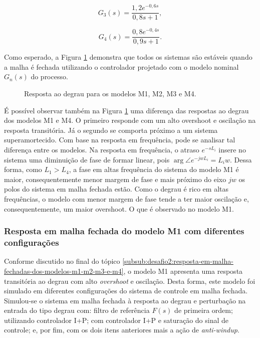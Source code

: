\begin{equation}
    \label{eq:desafio2:modelo-g3}
    G_{3}(s) = \frac{1,2e^{-0,6s}}{0,8s + 1},
\end{equation}

\begin{equation}
    \label{eq:desafio2:modelo-g4}
    G_{4}(s) = \frac{0,8e^{-0,4s}}{0,9s + 1}.
\end{equation}

Como esperado, a Figura \ref{fig:desafio2:questao5} demonstra que todos os
sistemas são estáveis quando a malha é fechada utilizando o controlador
projetado com o modelo nominal $G_{n}(s)$ do processo.

\begin{figure}[!ht]
    \caption{Resposta ao degrau para os modelos M1, M2, M3 e M4.}
    \vspace{-10pt}
    \hspace{-30pt}
    \label{fig:desafio2:questao5}
    \begin{minipage}{\linewidth}
        
    \end{minipage}
\end{figure}

É possível observar também na Figura \ref{fig:desafio2:questao5} uma diferença
das respostas ao degrau dos modelos M1 e M4. O primeiro responde com um alto
overshoot e oscilação na resposta transitória. Já o segundo se comporta próximo
a um sistema superamortecido. Com base na resposta em frequência, pode se
analisar tal diferença entre os modelos. Na resposta em frequência, o atraso
$e^{-sL_{i}}$ insere no sistema uma diminuição de fase de formar linear, pois
$\arg\angle e^{-jwL_{i}} = L_{i}w$. Dessa forma, como $L_{1} > L_{4}$, a fase em
altas frequência do sistema do modelo M1 é maior, consequentemente menor margem
de fase e mais próximo do eixo $jw$ os polos do sistema em malha fechada estão.
Como o degrau é rico em altas frequências, o modelo com menor margem de fase
tende a ter maior oscilação e, consequentemente, um maior overshoot. O que é
observado no modelo M1.

\subsubsection{Resposta em malha fechada do modelo M1 com diferentes configurações}
Conforme discutido no final do tópico
\ref{subsub:desafio2:resposta-em-malha-fechadas-dos-modelos-m1-m2-m3-e-m4}, o
modelo M1 apresenta uma resposta transitória ao degrau com alto
\textit{overshoot} e oscilação. Desta forma, este modelo foi simulado em
diferentes configurações do sistema de controle em malha fechada. Simulou-se o
sistema em malha fechada à resposta ao degrau e perturbação na entrada do tipo
degrau com: filtro de referência $F(s)$ de primeira ordem; utilizando
controlador I+P; com controlador I+P e saturação do sinal de controle; e, por
fim, com os dois itens anteriores mais a ação de \textit{anti-windup}.

